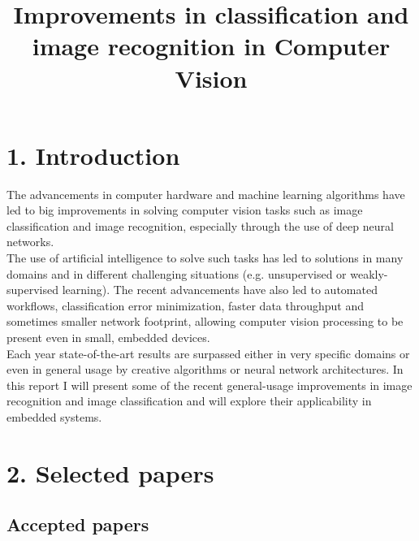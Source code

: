 \documentclass[11pt, a4paper, oneside, pdftex]{research_paper}
\begin{document}
\renewcommand{\bibname}{References}

\title{Improvements in classification and image recognition in Computer Vision}
\thispagestyle{empty}
\beforepreface
\titleformat{\chapter}{\normalfont\bfseries}{}{0pt}{\Large}
\titlespacing{\chapter}{0pt}{0pt}{40pt}

  
\section*{1. Introduction}
\hspace{30mm}    The advancements in computer hardware and machine learning algorithms have led to  big improvements in solving computer vision tasks such as image classification and image recognition, especially through the use of deep neural networks. \\
\null \hspace{30mm}	The use of artificial intelligence to solve such tasks has led to solutions in many domains and in different challenging situations (e.g. unsupervised or weakly-supervised learning). The recent advancements have also led to automated workflows, classification error minimization, faster data throughput and sometimes smaller network footprint, allowing computer vision processing to be present even in small, embedded devices. \\
\null \hspace{30mm}	Each year state-of-the-art results are surpassed either in very specific domains or even in general usage by creative algorithms or neural network architectures. In this report I will present some of the recent general-usage improvements in image recognition and image classification and will explore their applicability in embedded systems.

\section*{2. Selected papers}
\subsection*{Accepted papers}
\end{document}
